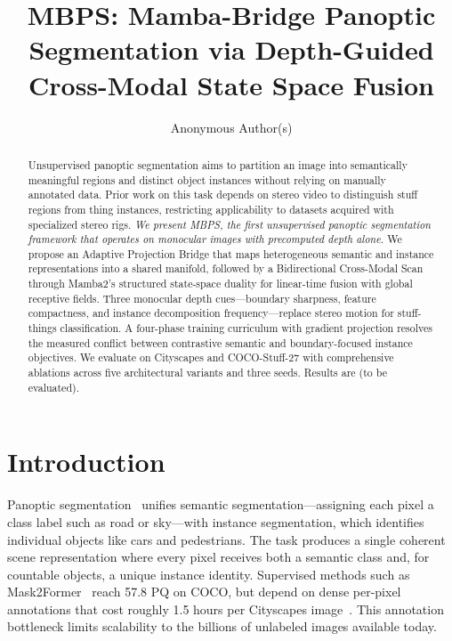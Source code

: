 \documentclass[10pt,twocolumn,letterpaper]{article}
\title{MBPS: Mamba-Bridge Panoptic Segmentation via Depth-Guided Cross-Modal State Space Fusion}
\author{Anonymous Author(s)}
\begin{document}
\maketitle

\begin{abstract}
Unsupervised panoptic segmentation aims to partition an image into semantically meaningful regions and distinct object instances without relying on manually annotated data. Prior work on this task depends on stereo video to distinguish stuff regions from thing instances, restricting applicability to datasets acquired with specialized stereo rigs. \emph{We present MBPS, the first unsupervised panoptic segmentation framework that operates on monocular images with precomputed depth alone.} We propose an Adaptive Projection Bridge that maps heterogeneous semantic and instance representations into a shared manifold, followed by a Bidirectional Cross-Modal Scan through Mamba2's structured state-space duality for linear-time fusion with global receptive fields. Three monocular depth cues---boundary sharpness, feature compactness, and instance decomposition frequency---replace stereo motion for stuff-things classification. A four-phase training curriculum with gradient projection resolves the measured conflict between contrastive semantic and boundary-focused instance objectives. We evaluate on Cityscapes and COCO-Stuff-27 with comprehensive ablations across five architectural variants and three seeds. Results are \underline{\hspace{2em}} (to be evaluated).
\end{abstract}


\section{Introduction}
\label{sec:intro}

Panoptic segmentation~\cite{kirillov2019panoptic} unifies semantic segmentation---assigning each pixel a class label such as road or sky---with instance segmentation, which identifies individual objects like cars and pedestrians. The task produces a single coherent scene representation where every pixel receives both a semantic class and, for countable objects, a unique instance identity. Supervised methods such as Mask2Former~\cite{cheng2022mask2former} reach 57.8 PQ on COCO, but depend on dense per-pixel annotations that cost roughly 1.5 hours per Cityscapes image~\cite{cordts2016cityscapes}. This annotation bottleneck limits scalability to the billions of unlabeled images available today.
\end{document}
